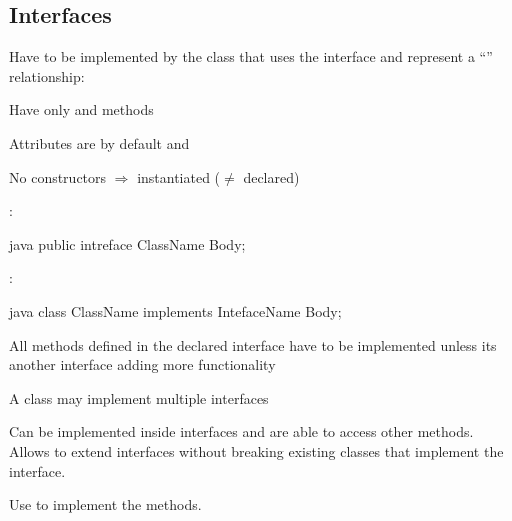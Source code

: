 \subsection{Interfaces}
\begin{defnbox}\nospacing
  \begin{defn}[Interfaces=pure abstract class]\label{defn:interfaces}
    Have to be implemented by the class that uses the interface and represent a
    ``'' relationship:
    \begin{figure}[H]	
      \centering
        \resizebox{0.35\linewidth}{!}{\tikzset{font=\Huge}}
    \end{figure}
    \begin{itemizenosep}
      \item Have only  and  methods
      \item Attributes are by default  and
      \item No constructors $\Rightarrow$ instantiated ($\neq$ declared)
    \end{itemizenosep}
    :
    \begin{mintlinebox}{java}
      public intreface ClassName{ Body; }
    \end{mintlinebox}
    :
    \begin{mintlinebox}{java}
      class ClassName implements IntefaceName{ Body; }
    \end{mintlinebox}
    \begin{itemizenosep}
        \item All methods defined in the declared interface have to be
      implemented unless its another interface adding more functionality
        \item A class may implement multiple interfaces
    \end{itemizenosep}
  \end{defn}
\end{defnbox}
\begin{notebox}\nospacing
  Can be implemented inside interfaces and are able to access other methods.
  Allows to extend interfaces without breaking existing classes that implement
  the interface.
\end{notebox}
\begin{stylebox}\nospacing
  Use  to implement the methods.
\end{stylebox}
